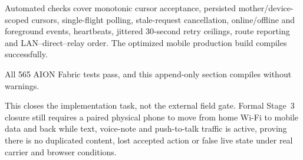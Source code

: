 Automated checks cover monotonic cursor acceptance, persisted mother/device-scoped cursors,
single-flight polling, stale-request cancellation, online/offline and foreground events,
heartbeats, jittered 30-second retry ceilings, route reporting and LAN--direct--relay order.
The optimized mobile production build compiles successfully.

All 565 AION Fabric tests pass, and this append-only section compiles without warnings.

This closes the implementation task, not the external field gate.  Formal Stage~3 closure
still requires a paired physical phone to move from home Wi-Fi to mobile data and back while
text, voice-note and push-to-talk traffic is active, proving there is no duplicated content,
lost accepted action or false live state under real carrier and browser conditions.
